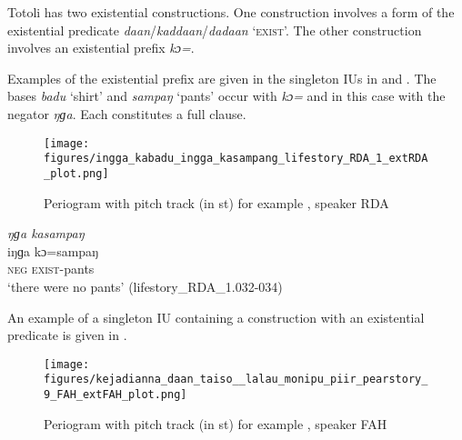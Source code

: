 Totoli has two existential constructions. One construction involves a form of the existential predicate \textit{daan}/\textit{kaddaan}/\textit{dadaan} `\textsc{exist}'. The other construction involves an existential  prefix  \textit{kɔ=}. 


Examples of the existential prefix are given in the singleton IUs in   and . The bases \textit{badu} `shirt' and \textit{sampaŋ} `pants' occur with \textit{kɔ=} and in this case with the negator \textit{ŋɡa}. Each constitutes a full clause.

\begin{figure}
	\texttt{[image: figures/ingga\_kabadu\_ingga\_kasampang\_lifestory\_RDA\_1\_extRDA\_plot.png]}
	\caption{Periogram with pitch track (in st) for example , speaker RDA}
	\label{pitch:NPx}
\end{figure}



\ea
\label{ex:NPx}


{
	\ex
	\label{ex:ngga  sampang}
	\textit{ŋɡa  kasampaŋ} \\
	\gll iŋɡa kɔ=sampaŋ \\
	\textsc{neg}   \textsc{exist}-pants\\
	\glt `there were no pants'
	\hfill(lifestory\_RDA\_1.032-034)
}
\z
\z

An example of a singleton IU containing a construction with an existential predicate is given in  .  


\begin{figure}
	\texttt{[image: figures/kejadianna\_daan\_taiso\_\_lalau\_monipu\_piir\_pearstory\_9\_FAH\_extFAH\_plot.png]}
	\caption{Periogram with pitch track (in st) for example , speaker FAH}
	\label{pitch:NPdaan}
\end{figure}


\ea
\label{ex:NPdaan}



